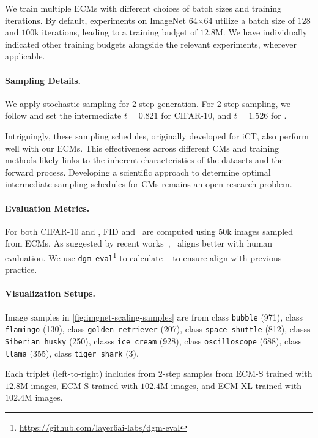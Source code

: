 We train multiple ECMs with different choices of batch sizes and training iterations. 
By default, experiments on ImageNet 64$\times$64 utilize a batch size of $128$ and $100$k iterations, leading to a training budget of $12.8\mathrm{M}$.
We have individually indicated other training budgets alongside the relevant experiments, wherever applicable. 

\paragraph{Sampling Details.}
%
We apply stochastic sampling for 2-step generation.
For 2-step sampling, we follow \citep{ict} and set the intermediate $t=0.821$ for CIFAR-10, and $t=1.526$ for \imgnet. 

Intriguingly, these sampling schedules, originally developed for iCT, also perform well with our ECMs. This effectiveness across different CMs and training methods likely links to the inherent characteristics of the datasets and the forward process. Developing a scientific approach to determine optimal intermediate sampling schedules for CMs remains an open research problem.

\paragraph{Evaluation Metrics.} For both CIFAR-10 and \imgnet, FID and \dino\ are computed using $50$k images sampled from ECMs. As suggested by recent works~\citep{fd_dino,Karras2024edm2}, \dino\ aligns better with human evaluation. We use \texttt{dgm-eval}\footnote{\href{https://github.com/layer6ai-labs/dgm-eval/tree/master}{https://github.com/layer6ai-labs/dgm-eval}} to calculate \dino~\citep{fd_dino} to ensure align with previous practice.

\paragraph{Visualization Setups.} Image samples in \cref{fig:imgnet-scaling-samples} are from class \texttt{bubble} (971), class \texttt{flamingo} (130), class \texttt{golden retriever} (207), class \texttt{space shuttle} (812), classs \texttt{Siberian husky} (250), classs \texttt{ice cream} (928), class \texttt{oscilloscope} (688), class \texttt{llama} (355), class \texttt{tiger shark} (3).

Each triplet (left-to-right) includes from $2$-step samples from ECM-S trained with $12.8\mathrm{M}$ images, ECM-S trained with $102.4\mathrm{M}$ images, and ECM-XL trained with $102.4\mathrm{M}$ images.

